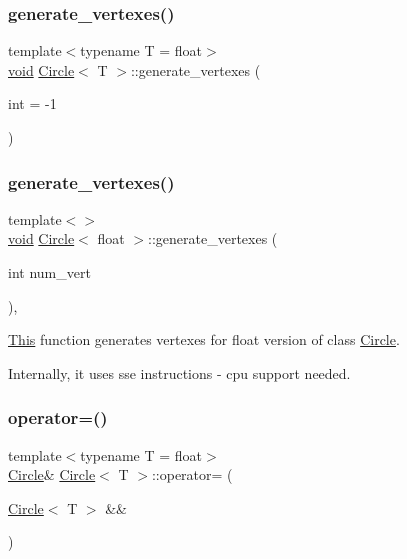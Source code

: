 \subsubsection{\texorpdfstring{generate\+\_\+vertexes()}{generate\_vertexes()}\hspace{0.1cm}{\footnotesize\ttfamily [1/2]}}
{\footnotesize\ttfamily template$<$typename T  = float$>$ \\
\mbox{\hyperlink{glad_8h_a950fc91edb4504f62f1c577bf4727c29}{void}} \mbox{\hyperlink{classCircle}{Circle}}$<$ T $>$\+::generate\+\_\+vertexes (\begin{DoxyParamCaption}\item[{int}]{ = {\ttfamily -\/1} }\end{DoxyParamCaption})\hspace{0.3cm}{\ttfamily [private]}}

\mbox{\label{classCircle_a5c5d9e9bf7ddada0681ad6977e4469f6}} 
\subsubsection{\texorpdfstring{generate\+\_\+vertexes()}{generate\_vertexes()}\hspace{0.1cm}{\footnotesize\ttfamily [2/2]}}
{\footnotesize\ttfamily template$<$$>$ \\
\mbox{\hyperlink{glad_8h_a950fc91edb4504f62f1c577bf4727c29}{void}} \mbox{\hyperlink{classCircle}{Circle}}$<$ float $>$\+::generate\+\_\+vertexes (\begin{DoxyParamCaption}\item[{int}]{num\+\_\+vert }\end{DoxyParamCaption})\hspace{0.3cm}{\ttfamily [inline]}, {\ttfamily [private]}}



\mbox{\hyperlink{classThis}{This}} function generates vertexes for float version of class \mbox{\hyperlink{classCircle}{Circle}}. 

Internally, it uses sse instructions -\/ cpu support needed. \mbox{\label{classCircle_a06c8a2624fa51b38023e0326e8ccf789}} 
\subsubsection{\texorpdfstring{operator=()}{operator=()}\hspace{0.1cm}{\footnotesize\ttfamily [1/2]}}
{\footnotesize\ttfamily template$<$typename T  = float$>$ \\
\mbox{\hyperlink{classCircle}{Circle}}\& \mbox{\hyperlink{classCircle}{Circle}}$<$ T $>$\+::operator= (\begin{DoxyParamCaption}\item[{\mbox{\hyperlink{classCircle}{Circle}}$<$ T $>$ \&\&}]{ }\end{DoxyParamCaption})\hspace{0.3cm}{\ttfamily [default]}}

